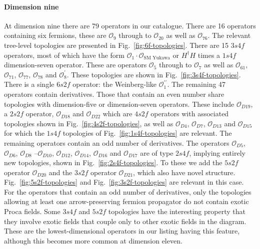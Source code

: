 \paragraph{Dimension nine} At dimension nine there are 79 operators in our
catalogue. There are 16 operators containing six fermions, these are
$\mathcal{O}_{9}$ through to $\mathcal{O}_{20}$ as well as $\mathcal{O}_{76}$.
The relevant tree-level topologies are presented in
Fig.~\ref{fig:6f-topologies}. There are 15 $3s4f$ operators, most of which have
the form $\mathcal{O}_{1} \cdot \mathcal{O}_{\text{SM Yukawa}}$ or $H^\dagger H$
times a $1s4f$ dimension-seven operator. These are operators $\mathcal{O}_{5}$
through to $\mathcal{O}_{7}$ as well as $\mathcal{O}_{61}$, $\mathcal{O}_{71}$,
$\mathcal{O}_{77}$, $\mathcal{O}_{78}$ and $\mathcal{O}_{8}^{\prime}$. These
topologies are shown in Fig.~\ref{fig:3s4f-topologies}. There is a single $6s2f$
operator: the Weinberg-like $\mathcal{O}_{1}^{\prime\prime}$. The remaining 47
operators contain derivatives. Those that contain an even number share
topologies with dimension-five or dimension-seven operators. These include
$\mathcal{O}_{D19}$, a $2s2f$ operator, $\mathcal{O}_{D18}$ and
$\mathcal{O}_{D22}$ which are $4s2f$ operators with associated topologies shown
in Fig.~\ref{fig:4s2f-topologies}, as well as $\mathcal{O}_{D4}$,
$\mathcal{O}_{D7}$, $\mathcal{O}_{D13}$ and $\mathcal{O}_{D15}$ for which the
$1s4f$ topologies of Fig.~\ref{fig:1s4f-topologies} are relevant. The remaining
operators contain an odd number of derivatives. The operators
$\mathcal{O}_{D5}$, $\mathcal{O}_{D6}$, $\mathcal{O}_{D8}\text{ --
}\mathcal{O}_{D10}$, $\mathcal{O}_{D12}$, $\mathcal{O}_{D14}$,
$\mathcal{O}_{D16}$ and $\mathcal{O}_{D17}$ are of type $2s4f$, implying
entirely new topologies, shown in Fig.~\ref{fig:2s4f-topologies}. To these we
add the $5s2f$ operator $\mathcal{O}_{D20}$ and the $3s2f$ operator
$\mathcal{O}_{D21}$, which also have novel structure.
Fig.~\ref{fig:5s2f-topologies} and Fig.~\ref{fig:3s2f-topologies} are relevant
in this case. For the operators that contain an odd number of derivatives, only
the topologies allowing at least one arrow-preserving fermion propagator do not
contain exotic Proca fields. Some $3s4f$ and $5s2f$ topologies have the
interesting property that they involve exotic fields that couple only to other
exotic fields in the diagram. These are the lowest-dimensional operators in our
listing having this feature, although this becomes more common at dimension
eleven.

